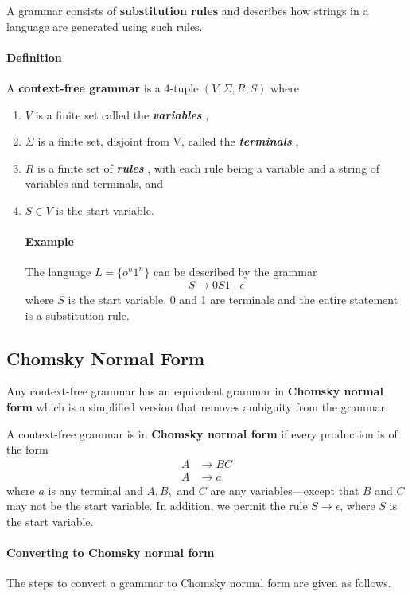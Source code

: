A grammar consists of \textbf{substitution rules} and describes how strings in a language are generated using such rules.

\paragraph{Definition} A \textbf{context-free grammar} is a 4-tuple \( (V, \Sigma, R, S) \) where

\begin{enumerate}
	\item \( V \) is a finite set called the \emph{\textbf{variables} },
	\item \( \Sigma \) is a finite set, disjoint from V, called the \textbf{\emph{terminals} },
	\item \( R \) is a finite set of \textbf{\emph{rules} }, with each rule being a variable and a string of variables and terminals, and
	\item	\( S \in V \) is the start variable.

	\paragraph{Example} The language \( L = \{o^n1^n\} \) can be described by the grammar \[
	S \rightarrow 0S1 \mid \epsilon	
	\]
	where \( S \) is the start variable, 0 and 1 are terminals and the entire statement is a substitution rule.
\end{enumerate}

\subsection{Chomsky Normal Form}
Any context-free grammar has an equivalent grammar in \textbf{Chomsky normal form} which is a simplified version that removes ambiguity from the grammar.

A context-free grammar is in \textbf{Chomsky normal form} if every production is of the form 
\begin{align*}
	A &\rightarrow BC \\
	A &\rightarrow a
\end{align*}
where \( a \) is any terminal and \( A, B, \) and \( C \) are any variables---except that \( B  \) and \( C \) may not be the start variable. In addition, we permit the rule \( S \rightarrow \epsilon \), where \( S \) is the start variable.

\paragraph{Converting to Chomsky normal form} The steps to convert a grammar to Chomsky normal form are given as follows.

